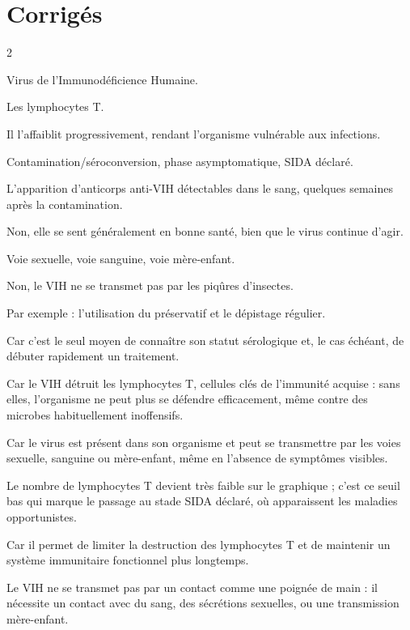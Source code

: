 \section{Corrigés}
\begin{multicols}{2}

Virus de l'Immunodéficience Humaine.

Les lymphocytes T.

Il l'affaiblit progressivement, rendant l'organisme vulnérable aux infections.

Contamination/séroconversion, phase asymptomatique, SIDA déclaré.

L'apparition d'anticorps anti-VIH détectables dans le sang, quelques semaines après la
contamination.

Non, elle se sent généralement en bonne santé, bien que le virus continue d'agir.

Voie sexuelle, voie sanguine, voie mère-enfant.

Non, le VIH ne se transmet pas par les piqûres d'insectes.

Par exemple : l'utilisation du préservatif et le dépistage régulier.

Car c'est le seul moyen de connaître son statut sérologique et, le cas échéant, de
débuter rapidement un traitement.

Car le VIH détruit les lymphocytes T, cellules clés de l'immunité acquise : sans elles,
l'organisme ne peut plus se défendre efficacement, même contre des microbes habituellement
inoffensifs.

Car le virus est présent dans son organisme et peut se transmettre par les voies
sexuelle, sanguine ou mère-enfant, même en l'absence de symptômes visibles.

Le nombre de lymphocytes T devient très faible sur le graphique ; c'est ce seuil bas qui
marque le passage au stade SIDA déclaré, où apparaissent les maladies opportunistes.

Car il permet de limiter la destruction des lymphocytes T et de maintenir un système
immunitaire fonctionnel plus longtemps.

Le VIH ne se transmet pas par un contact comme une poignée de main : il nécessite un
contact avec du sang, des sécrétions sexuelles, ou une transmission mère-enfant.


\end{multicols}
